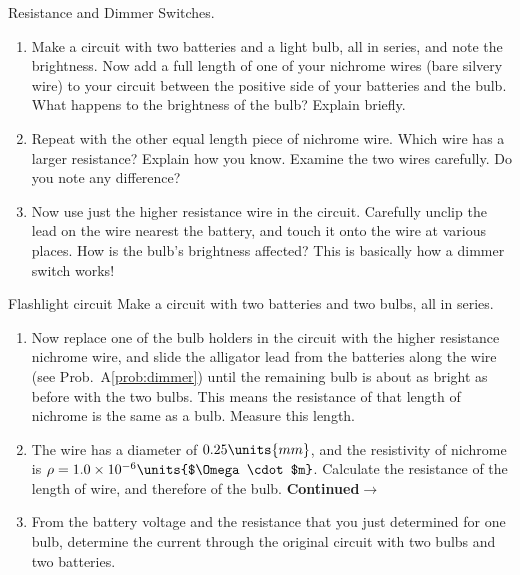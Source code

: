 \begin{aproblem}{Resistance and Dimmer Switches.}
  \begin{enumerate}
  \item Make a circuit with two batteries and a light bulb, all in
    series, and note the brightness.  Now add a full length of one of
    your nichrome wires (bare silvery wire) to your circuit between
    the positive side of your batteries and the bulb.  What happens to
    the brightness of the bulb?  Explain briefly.
  \item Repeat with the other equal length piece of nichrome wire.
    Which wire has a larger resistance? %
    Explain how you know.  Examine the two wires carefully.  Do you
    note any difference?
  \item Now use just the higher resistance wire in the circuit.
    Carefully unclip the lead on the wire nearest the battery, and
    touch it onto the wire at various places.  How is the bulb's
    brightness affected?  This is basically how a dimmer switch works!
  \end{enumerate}
  \label{prob:dimmer}
\end{aproblem}

\begin{aproblem}{Flashlight circuit}
  Make a circuit with two batteries and two bulbs, all in series.
  \begin{enumerate}
  \item Now replace one of the bulb holders in the circuit with the
    higher resistance nichrome wire, and slide the alligator lead from
    the batteries along the wire (see Prob.~A\ref{prob:dimmer}) until
    the remaining bulb is about as bright as before with the two
    bulbs. This means the resistance of that length of nichrome is the
    same as a bulb. Measure this length.
  \item The wire has a diameter of $0.25\units{mm}$, and the
    resistivity of nichrome is $\rho = 1.0 \times
    10^{-6}\units{$\Omega\cdot$m}$.  Calculate the resistance of the
    length of wire, and therefore of the bulb.  {\bf Continued}$\rightarrow$
  \item From the battery voltage and the resistance that you just
    determined for one bulb, determine the current through the
    original circuit with two bulbs and two batteries.
  \end{enumerate}
\end{aproblem}


